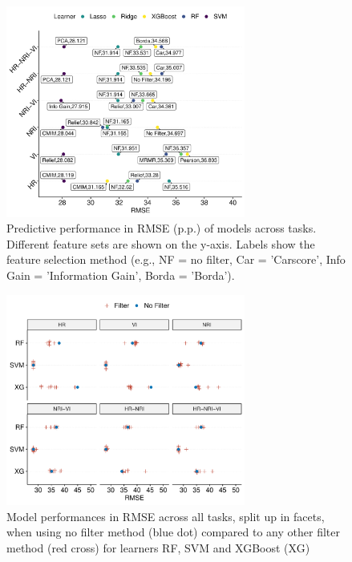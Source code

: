 \documentclass[remotesensing,article,submit,moreauthors,pdftex]{Definitions/mdpi}
\begin{document}






\begin{figure} [t!]
	\centering
	\begin{center}
		\includegraphics[width=0.7\textwidth] {performance-results-1.pdf}
		\caption{Predictive performance in RMSE (p.p.) of models across tasks. Different feature sets are shown on the y-axis. Labels show the feature selection method (e.g., NF = no filter, Car = 'Carscore', Info Gain = 'Information Gain', Borda = 'Borda').}\label{fig:perf-result}
	\end{center}
\end{figure}

\begin{figure} [t!]
	\centering
	\begin{center}
		\includegraphics[width=0.7\textwidth] {filter-effect-all-vs-no-filter-1.pdf}
		\caption{Model performances in RMSE across all tasks, split up in facets, when using no filter method (blue dot) compared to any other filter method (red cross) for learners RF, SVM and XGBoost (XG)}\label{fig:filter-effects-no-filter}
	\end{center}
\end{figure}
\end{document}
